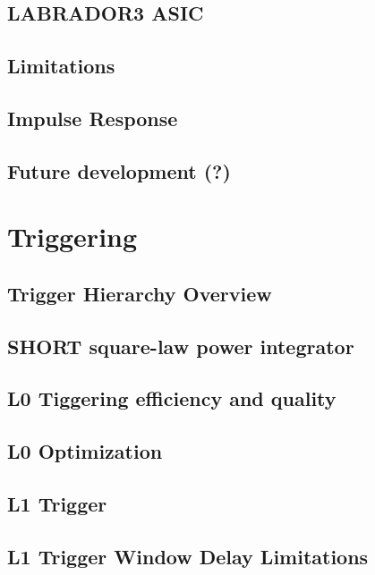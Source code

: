 \documentclass[11pt]{uhthesis}
\begin{document}
	\subsection{LABRADOR3 ASIC}

	\subsection{Limitations}

	\subsection{Impulse Response}
	
	\subsection{Future development (?)}
		
		
\section{Triggering}
	
	\subsection{Trigger Hierarchy Overview}
	
	\subsection{SHORT square-law power integrator}
		
	\subsection{L0 Tiggering efficiency and quality}
		
	\subsection{L0 Optimization}
	
	\subsection{L1 Trigger}
	
	\subsection{L1 Trigger Window Delay Limitations}
		
\end{document}
